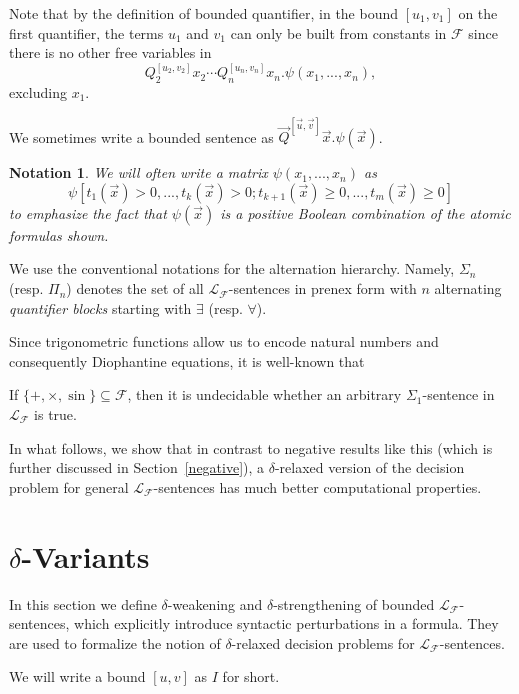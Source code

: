 \documentclass[prodmode]{acmsmall} %
\newtheorem{notation}[theorem]{Notation}
\begin{document}
\begin{remark} Note that by the definition of bounded quantifier, in the bound $[u_1,v_1]$ on the first quantifier, the terms $u_1$ and $v_1$ can only be built from constants in $\mathcal{F}$ since there is no other free variables in 
$$Q_2^{[u_2,v_2]}x_2\cdots Q_n^{[u_n,v_n]}x_n.\psi(x_1,...,x_n),$$ excluding $x_1$. 
\end{remark}
We sometimes write a bounded sentence as $\vec Q^{[\vec u,\vec v]}\vec x.\psi(\vec x)$. 


\begin{notation}
We will often write a matrix $\psi(x_1,...,x_n)$ as 
$$\psi[t_1(\vec x)>0,...,t_k(\vec x)>0; t_{k+1}(\vec x)\geq 0,...,t_m(\vec x)\geq 0]$$
to emphasize the fact that $\psi(\vec x)$ is a positive Boolean combination of the atomic formulas shown. 
\end{notation}

We use the conventional notations for the alternation hierarchy. Namely, $\Sigma_n$ (resp. $\Pi_n$) denotes the set of all $\mathcal{L}_{\mathcal{F}}$-sentences in prenex form with $n$ alternating {\em quantifier blocks} starting with $\exists$ (resp. $\forall$). 

Since trigonometric functions allow us to encode natural numbers and consequently Diophantine equations, it is well-known that
\begin{proposition}
If $\{+,\times,\sin\}\subseteq \mathcal{F}$, then it is undecidable whether an arbitrary $\Sigma_1$-sentence in $\mathcal{L}_{\mathcal{F}}$ is true.
\end{proposition}
In what follows, we show that in contrast to negative results like this (which is further discussed in Section~\ref{negative}), a $\delta$-relaxed version of the decision problem for general $\mathcal{L}_{\mathcal{F}}$-sentences has much better computational properties. 


\section{$\delta$-Variants}\label{vary}

In this section we define $\delta$-weakening and $\delta$-strengthening of bounded $\mathcal{L}_{\mathcal{F}}$-sentences, which explicitly introduce syntactic perturbations in a formula. They are used to formalize the notion of $\delta$-relaxed decision problems for $\mathcal{L}_{\mathcal{F}}$-sentences. 

We will write a bound $[u,v]$ as $I$ for short. 
\end{document}
